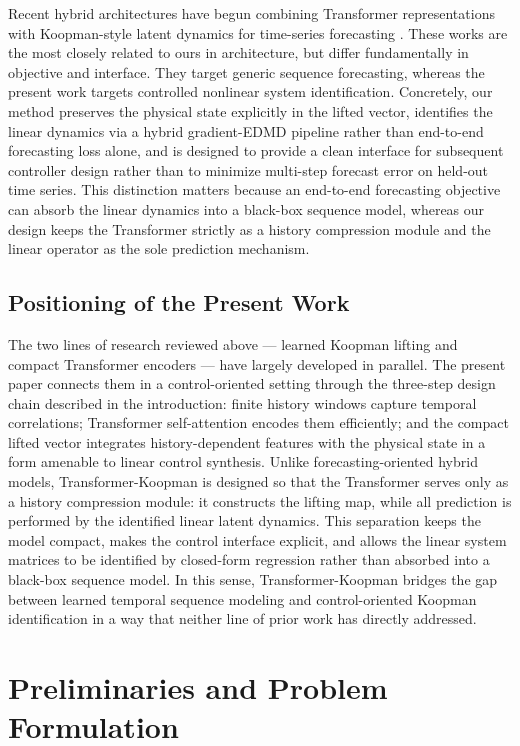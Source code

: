 \documentclass[journal]{IEEEtran}
\begin{document}
Recent hybrid architectures have begun combining Transformer representations with Koopman-style latent dynamics for time-series forecasting \cite{forootani2026deepkoopformer, forootani2026spectral}. These works are the most closely related to ours in architecture, but differ fundamentally in objective and interface. They target generic sequence forecasting, whereas the present work targets controlled nonlinear system identification. Concretely, our method preserves the physical state explicitly in the lifted vector, identifies the linear dynamics via a hybrid gradient-EDMD pipeline rather than end-to-end forecasting loss alone, and is designed to provide a clean interface for subsequent controller design rather than to minimize multi-step forecast error on held-out time series. This distinction matters because an end-to-end forecasting objective can absorb the linear dynamics into a black-box sequence model, whereas our design keeps the Transformer strictly as a history compression module and the linear operator as the sole prediction mechanism.

\subsection{Positioning of the Present Work}

The two lines of research reviewed above --- learned Koopman lifting and compact Transformer encoders --- have largely developed in parallel. The present paper connects them in a control-oriented setting through the three-step design chain described in the introduction: finite history windows capture temporal correlations; Transformer self-attention encodes them efficiently; and the compact lifted vector integrates history-dependent features with the physical state in a form amenable to linear control synthesis. Unlike forecasting-oriented hybrid models, Transformer-Koopman is designed so that the Transformer serves only as a history compression module: it constructs the lifting map, while all prediction is performed by the identified linear latent dynamics. This separation keeps the model compact, makes the control interface explicit, and allows the linear system matrices to be identified by closed-form regression rather than absorbed into a black-box sequence model. In this sense, Transformer-Koopman bridges the gap between learned temporal sequence modeling and control-oriented Koopman identification in a way that neither line of prior work has directly addressed.

\section{Preliminaries and Problem Formulation}
\label{sec:preliminaries_and_problem}
\end{document}
